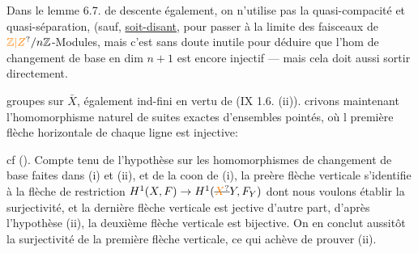 Dans le lemme 6.7. de descente également, on n'utilise pas la quasi-compacité et quasi-séparation, (sauf, \uline{soit-disant}, pour passer à la limite   des faisceaux de $\unsure{\mathbb Z|Z}/n\mathbb Z$-Modules, mais c'est sans doute inutile    pour déduire que l'hom de changement de base en dim $n+1$ est encore injectif --- mais cela doit aussi sortir directement.

groupes sur $\bar X$, également ind-fini en vertu de (IX 1.6. (ii)). crivons maintenant l'homomorphisme naturel de suites exactes d'ensembles pointés, où l première flèche horizontale de chaque ligne est injective:


cf (). Compte tenu de l'hypothèse sur les homomorphismes de changement de base faites dans (i) et (ii), et de la coon de (i), la preère flèche verticale s'identifie à la flèche de restriction $H^1(X,F)\handwritten{\to}H^1(\deleted{\unsure{X}}Y,F_Y)$ dont nous voulons établir la surjectivité, et la dernière flèche verticale est jective\handwritten{;} d'autre part, d'après l'hypothèse (ii), la deuxième flèche verticale est bijective. On en conclut aussitôt la  surjectivité de la première flèche verticale, ce qui achève de prouver (ii). 

